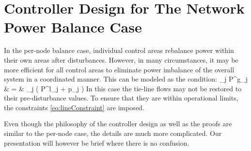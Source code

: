 \section {Controller Design for The Network Power Balance Case}
\label{sec:npb}

In the per-node balance case, individual control areas rebalance power within their own areas
after disturbances. However, in many circumstances, it may be more efficient for all control 
areas to eliminate power imbalance of the overall system in a coordinated manner. This can 
be modeled as the condition:
\bq
\label{eq:balance.net}
\sum\nolimits_j P^g_j & = &  \sum\nolimits_j \left( P^l_j + p_j \right)
\eq
In this case the tie-line flows may not be restored to their pre-disturbance values.
To ensure that they are within operational limits, the constraints \eqref{eq:lineConstraint}
are imposed.

Even though the philosophy of the controller design as well as the proofs are similar to the per-node case, 
the details are much more complicated.   
Our presentation will however be brief where there is no confusion.



